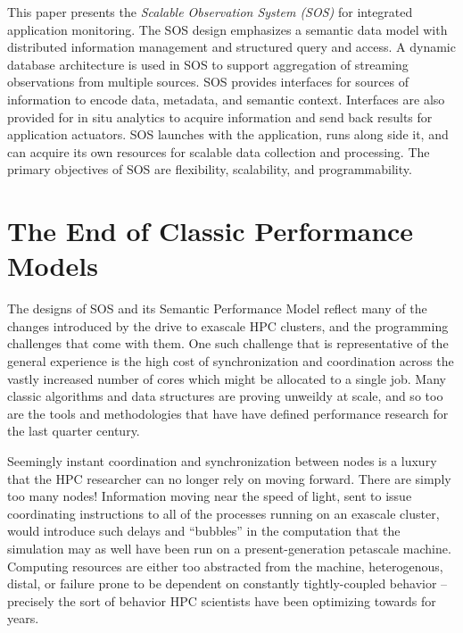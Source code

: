 This paper presents the \textit{Scalable Observation System (SOS)} for
integrated application monitoring.  The SOS design emphasizes a semantic
data model with distributed information management and structured query and
access.  A dynamic database architecture is used in SOS to support
aggregation of streaming observations from multiple sources.  SOS provides
interfaces for sources of information to encode data, metadata, and
semantic context.  Interfaces are also provided for in situ analytics to
acquire information and send back results for application actuators.  SOS
launches with the application, runs along side it, and can acquire its own
resources for scalable data collection and processing.  The primary
objectives of SOS are flexibility, scalability, and programmability.


\section{The End of Classic Performance Models}

The designs of SOS and its Semantic Performance Model reflect many of
the changes introduced by the drive to exascale HPC clusters, and the
programming challenges that come with them. One such challenge that is
representative of the general experience is the high cost of
synchronization and coordination across the vastly increased number of
cores which might be allocated to a single job. Many classic
algorithms and data structures are proving unweildy at scale, and so
too are the tools and methodologies that have have defined performance
research for the last quarter century.

Seemingly instant coordination and synchronization between nodes is a
luxury that the HPC researcher can no longer rely on moving
forward. There are simply too many nodes! Information moving near the
speed of light, sent to issue coordinating instructions to all of the
processes running on an exascale cluster, would introduce such delays
and ``bubbles'' in the computation that the simulation may as well
have been run on a present-generation petascale machine. Computing
resources are either too abstracted from the machine, heterogenous,
distal, or failure prone to be dependent on constantly tightly-coupled
behavior -- precisely the sort of behavior HPC scientists have been
optimizing towards for years.


